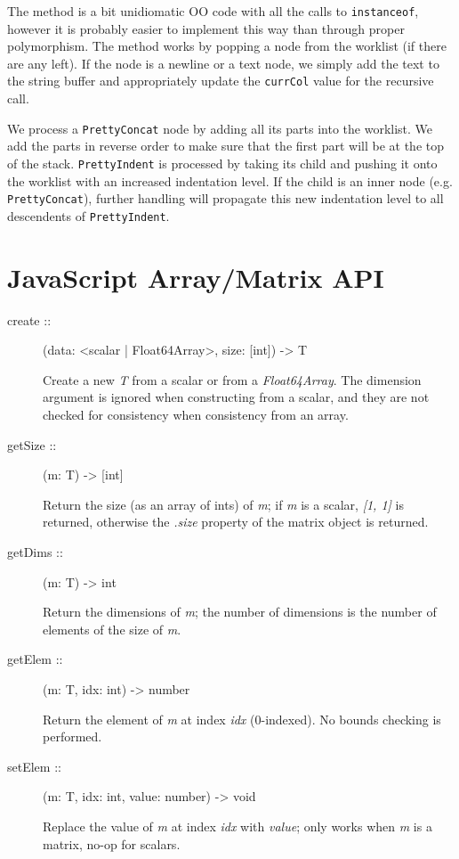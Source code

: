\documentclass[11pt]{article}
\begin{document}
The method is a bit unidiomatic OO code with all the calls to
\texttt{instanceof}, however it is probably easier to implement this way
than through proper polymorphism.  The method works by popping a node
from the worklist (if there are any left).  If the node is a newline
or a text node, we simply add the text to the string buffer and
appropriately update the \texttt{currCol} value for the recursive call.

We process a \texttt{PrettyConcat} node by adding all its parts into the
worklist.  We add the parts in reverse order to make sure that the
first part will be at the top of the stack.  \texttt{PrettyIndent} is
processed by taking its child and pushing it onto the worklist with an
increased indentation level.  If the child is an inner node
(e.g. \texttt{PrettyConcat}), further handling will propagate this new
indentation level to all descendents of \texttt{PrettyIndent}.
\section{JavaScript Array/Matrix API}
\label{sec-2}


\begin{description}
\item[create ::] (data: <scalar | Float64Array>, size: [int]) -> T

               Create a new \emph{T} from a scalar or from a
               \emph{Float64Array}.  The dimension argument is ignored
               when constructing from a scalar, and they are not
               checked for consistency when consistency from an array.
\item[getSize ::] (m: T) -> [int]

                Return the size (as an array of ints) of \emph{m}; if \emph{m}
                is a scalar, \emph{[1, 1]} is returned, otherwise the
                \emph{.size} property of the matrix object is returned.
\item[getDims ::] (m: T) -> int

                Return the dimensions of \emph{m}; the number of dimensions
                is the number of elements of the size of \emph{m}.
\item[getElem ::] (m: T, idx: int) -> number

                Return the element of \emph{m} at index \emph{idx}
                (0-indexed).  No bounds checking is performed.
\item[setElem ::] (m: T, idx: int, value: number) -> void

                Replace the value of \emph{m} at index \emph{idx} with \emph{value};
                only works when \emph{m} is a matrix, no-op for scalars.
\end{description}
\end{document}
